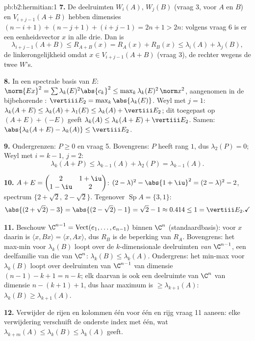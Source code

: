 \begin{solution}{pb:b2:hermitian:1}
\textbf{7.} De deelruimten $W_i(A)$, $W_j(B)$ (vraag 3, voor $A$ en
$B$) en $V_{i+j-1}(A+B)$ hebben dimensies $(n-i+1) + (n-j+1) +
(i+j-1) = 2n + 1 > 2n$: volgens vraag 6 is er een eenheidsvector
$x$ in alle drie. Dan is
\[
\lambda_{i+j-1}(A+B) \leq R_{A+B}(x)
= R_A(x) + R_B(x) \leq \lambda_i(A) + \lambda_j(B),
\]
de linkerongelijkheid omdat $x \in V_{i+j-1}(A+B)$ (vraag 3), de
rechter wegens de twee $W$'s.

\textbf{8.} In een spectrale basis van $E$: $\norm{Ex}^2 = \sum
\lambda_k(E)^2\abs{c_k}^2 \leq \max_k\lambda_k(E)^2\,\norm x^2$,
aangenomen in de bijbehorende : $\vertiii E_2 =
\max_k\abs{\lambda_k(E)}$. Weyl met $j = 1$: $\lambda_k(A+E) \leq
\lambda_k(A) + \lambda_1(E) \leq \lambda_k(A) + \vertiii E_2$; dit
toegepast op $(A+E) + (-E)$ geeft $\lambda_k(A) \leq \lambda_k(A+E)
+ \vertiii E_2$. Samen: $\abs{\lambda_k(A+E) - \lambda_k(A)} \leq
\vertiii E_2$.

\textbf{9.} Ondergrenzen: $P \geq 0$ en vraag 5. Bovengrens: $P$
heeft rang $1$, dus $\lambda_2(P) = 0$; Weyl met $i = k-1$, $j =
2$:
\[
\lambda_k(A + P) \leq \lambda_{k-1}(A) + \lambda_2(P)
= \lambda_{k-1}(A) .
\]

\textbf{10.} $A + E = \begin{pmatrix} 2 & 1+\iu\\ 1-\iu &
2\end{pmatrix}$:  $(2-\lambda)^2 -
\abs{1+\iu}^2 = (2-\lambda)^2 - 2$, spectrum $\{2 + \sqrt2,\ 2 -
\sqrt2\}$. Tegenover $\operatorname{Sp}A = \{3, 1\}$:
\[
\abs{(2+\sqrt2) - 3} = \abs{(2-\sqrt2) - 1} = \sqrt2 - 1
\approx 0.414 \leq 1 = \vertiii E_2 . \checkmark
\]

\textbf{11.} Beschouw $\C^{n-1} = \operatorname{Vect}(e_1, \dots,
e_{n-1})$ binnen $\C^n$ (standaardbasis): voor $x$ daarin is
$\langle x, Bx\rangle = \langle x, Ax\rangle$, dus $R_B$ is de
beperking van $R_A$. Bovengrens: het max-min voor $\lambda_k(B)$
loopt over de $k$-dimensionale deelruimten \emph{van} $\C^{n-1}$,
een deelfamilie van die van $\C^n$: $\lambda_k(B) \leq
\lambda_k(A)$. Ondergrens: het min-max voor $\lambda_k(B)$ loopt
over deelruimten van $\C^{n-1}$ van dimensie $(n-1)-k+1 = n-k$;
elk daarvan is ook een deelruimte van $\C^n$ van dimensie $n -
(k+1) + 1$, dus haar maximum is $\geq \lambda_{k+1}(A)$:
$\lambda_k(B) \geq \lambda_{k+1}(A)$.

\textbf{12.} Verwijder de rijen en kolommen één voor één en rijg
vraag 11 aaneen: elke verwijdering verschuift de onderste index met
één, wat $\lambda_{k+m}(A) \leq \lambda_k(B) \leq \lambda_k(A)$
geeft.


\end{solution}
